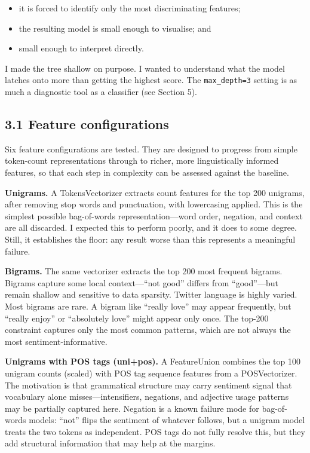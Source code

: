 \documentclass[12pt]{article}
\begin{document}
\begin{itemize}

  \item it is forced to identify only the most discriminating features;

  \item the resulting model is 
  small enough to visualise; and

  \item small enough to interpret directly.

\end{itemize}

I made the tree shallow on purpose. I wanted to understand what the model latches onto more than getting the highest score. The \texttt{max\_depth=3} setting is as much a diagnostic tool as a classifier (see Section 5).



\subsection*{3.1 Feature configurations}



Six feature configurations are tested. They are designed to progress from simple token-count representations through to richer, more linguistically informed features, so that each step in complexity can be assessed against the baseline.

\textbf{Unigrams.} A TokensVectorizer extracts count features for the top 200 unigrams, after removing stop words and punctuation, with lowercasing applied. This is the simplest possible bag-of-words representation---word order, negation, and context are all discarded. I expected this to perform poorly, and it does to some degree. Still, it establishes the floor: any result worse than this represents a meaningful failure.

\textbf{Bigrams.} The same vectorizer extracts the top 200 most frequent bigrams. Bigrams capture some local context---``not good'' differs from ``good''---but remain shallow and sensitive to data sparsity. Twitter language is highly varied. Most bigrams are rare. A bigram like ``really love'' may appear frequently, but ``really enjoy'' or ``absolutely love'' might appear only once. The top-200 constraint captures only the most common patterns, which are not always the most sentiment-informative.

\textbf{Unigrams with POS tags (uni+pos).} A FeatureUnion combines the top 100 unigram counts (scaled) with POS tag sequence features from a POSVectorizer. The motivation is that grammatical structure may carry sentiment signal that vocabulary alone misses---intensifiers, negations, and adjective usage patterns may be partially captured here. Negation is a known failure mode for bag-of-words models: ``not'' flips the sentiment of whatever follows, but a unigram model treats the two tokens as independent. POS tags do not fully resolve this, but they add structural information that may help at the margins.
\end{document}
